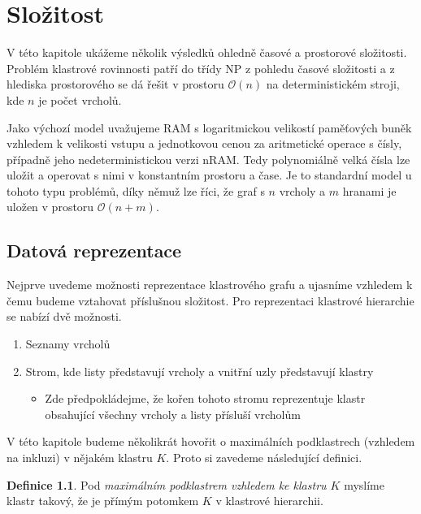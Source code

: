 \documentclass[12pt,a4report]{report}
\theoremstyle{definition}
\newtheorem{defn}[theorem]{Definice}
\begin{document}
\author{Filip Šedivý}


\chapter{Složitost}
\label{slozitost}

V této kapitole ukážeme několik výsledků ohledně časové a prostorové složitosti.
Problém klastrové rovinnosti patří do třídy NP z pohledu časové složitosti a z hlediska prostorového se dá řešit v prostoru $\mathcal{O}(n)$ na deterministickém stroji, kde $n$ je počet vrcholů.

Jako výchozí model uvažujeme RAM s logaritmickou velikostí paměťových buněk vzhledem k velikosti vstupu a jednotkovou cenou za aritmetické operace s čísly, případně jeho nedeterministickou verzi nRAM. Tedy polynomiálně velká čísla lze uložit a operovat s nimi v konstantním prostoru a čase. Je to standardní model u tohoto typu problémů, díky němuž lze říci, že graf s $n$ vrcholy a $m$ hranami je uložen v prostoru $\mathcal O (n+m)$.

\section{Datová reprezentace}
Nejprve uvedeme možnosti reprezentace klastrového grafu a ujasníme vzhledem k čemu budeme vztahovat příslušnou složitost. 
Pro reprezentaci klastrové hierarchie se nabízí dvě možnosti.

\begin{enumerate}
\item Seznamy vrcholů
\item Strom, kde listy představují vrcholy a vnitřní uzly představují klastry
\begin{itemize}
\item Zde předpokládejme, že kořen tohoto stromu reprezentuje klastr obsahující všechny vrcholy a listy přísluší vrcholům
\end{itemize}
\end{enumerate}

V této kapitole budeme několikrát hovořit o maximálních podklastrech (vzhledem na inkluzi) v nějakém klastru $K$. Proto si zavedeme následující definici.
\begin{defn}
Pod \textit{maximálním podklastrem vzhledem ke klastru $K$} myslíme klastr takový, že je přímým potomkem $K$ v klastrové hierarchii.
\end{defn}
\end{document}
